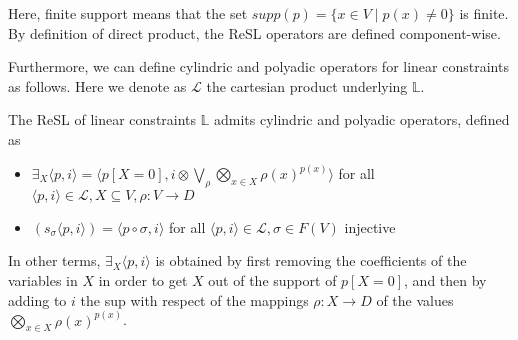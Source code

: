\documentclass{llncs}
\begin{document}
Here, finite support means that the set $supp(p) = \{x \in V\mid p(x) \neq 0\}$ is finite.
By definition of direct product, the ReSL operators are defined component-wise.

Furthermore, we can define cylindric and polyadic operators for linear constraints as follows. Here we denote as $\mathcal{L}$ the cartesian product underlying $\mathbb{L}$.
\begin{lemma}
	The ReSL of linear constraints $\mathbb{L}$ admits cylindric and polyadic operators, defined as
	\begin{itemize}
		\item  $\exists_X \langle p, i \rangle = \langle p[X = 0], i \otimes \bigvee_{\rho} \bigotimes_{x \in X} \rho(x)^{p(x)} \rangle$
		         for all $ \langle p, i \rangle \in \mathcal{L}, X \subseteq V, \rho : V \rightarrow D$
		\item  $(s_\sigma \langle p, i \rangle) = \langle p \circ \sigma, i \rangle$ for all $\langle p, i \rangle \in \mathcal{L}, \sigma \in F(V)$ injective		
	\end{itemize}
\end{lemma}

In other terms, $\exists_X \langle p, i \rangle$ is obtained by first removing the coefficients of the variables in $X$
in order to get $X$ out of the support of $p[X = 0]$, and then by adding to $i$ the sup with respect of the 
mappings $\rho: X \rightarrow D$ of the values $\bigotimes_{x \in X} \rho(x)^{p(x)}$.
\end{document}
